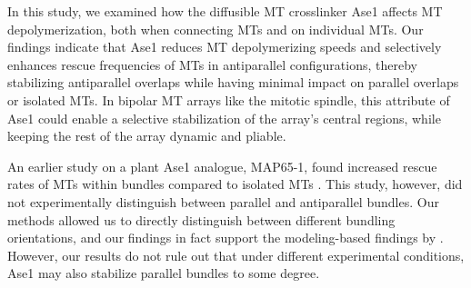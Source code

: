In this study, we examined how the diffusible MT crosslinker Ase1 affects MT depolymerization, both when connecting MTs and on individual MTs. Our findings indicate that Ase1 reduces MT depolymerizing speeds and selectively enhances rescue frequencies of MTs in antiparallel configurations, thereby stabilizing antiparallel overlaps while having minimal impact on parallel overlaps or isolated MTs. In bipolar MT arrays like the mitotic spindle, this attribute of Ase1 could enable a selective stabilization of the array's central regions, while keeping the rest of the array dynamic and pliable.


An earlier study on a plant Ase1 analogue, MAP65-1, found increased rescue rates of MTs within bundles compared to isolated MTs \parencite{Stoppin-Mellet2013}. This study, however, did not experimentally distinguish between parallel and antiparallel bundles. Our methods allowed us to directly distinguish between different bundling orientations, and our findings in fact support the modeling-based findings by \parencite{Stoppin-Mellet2013}. However, our results do not rule out that under different experimental conditions, Ase1 may also stabilize parallel bundles to some degree.\par

